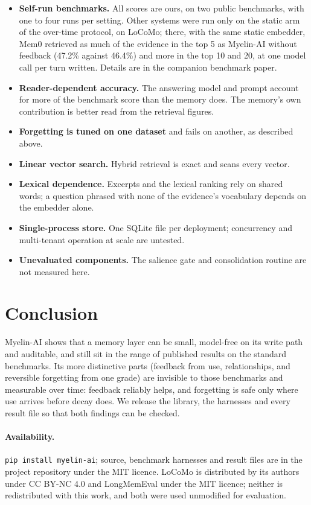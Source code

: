 \documentclass[11pt]{article}
\begin{document}
\begin{itemize}
\item \textbf{Self-run benchmarks.} All scores are ours, on two public
  benchmarks, with one to four runs per setting. Other systems
  were run only on the static arm of the over-time protocol, on
  LoCoMo; there, with the same static embedder, Mem0
  retrieved as much of the evidence in the top 5 as \mbox{Myelin-AI}
  without feedback (47.2\% against 46.4\%) and more in the top 10 and
  20, at one model call per turn written. Details are in the companion
  benchmark paper.
\item \textbf{Reader-dependent accuracy.} The answering model and
  prompt account for more of the benchmark score than the memory does.
  The memory's own contribution is better read from the retrieval
  figures.
\item \textbf{Forgetting is tuned on one dataset} and fails on
  another, as described above.
\item \textbf{Linear vector search.} Hybrid retrieval is exact and
  scans every vector.
\item \textbf{Lexical dependence.} Excerpts and the lexical ranking
  rely on shared words; a question phrased with none of the evidence's
  vocabulary depends on the embedder alone.
\item \textbf{Single-process store.} One SQLite file per deployment;
  concurrency and multi-tenant operation at scale are untested.
\item \textbf{Unevaluated components.} The salience gate and
  consolidation routine are not measured here.
\end{itemize}

\section{Conclusion}

\mbox{Myelin-AI} shows that a memory layer can be small, model-free on its write
path and auditable, and still sit in the range of published results on
the standard benchmarks. Its more distinctive parts (feedback from
use, relationships, and reversible forgetting from one grade) are
invisible to those benchmarks and measurable over time: feedback
reliably helps, and forgetting is safe only where use arrives before
decay does. We release the library, the harnesses and every result
file so that both findings can be checked.

\paragraph{Availability.} \texttt{pip install myelin-ai}; source,
benchmark harnesses and result files are in the project repository
under the MIT licence. LoCoMo \citep{maharana2024locomo} is distributed
by its authors under CC BY-NC 4.0 and LongMemEval
\citep{wu2025longmemeval} under the MIT licence; neither is
redistributed with this work, and both were used unmodified for
evaluation.
\end{document}
